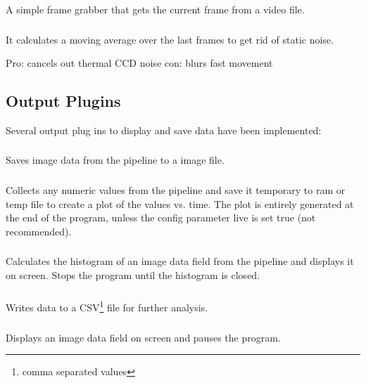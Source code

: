 A simple frame grabber that gets the current frame from a video file.

\subsubsection[inpAveragingFrameGrabber]{}

It calculates a moving average over the last  frames to get rid of static noise.

Pro: cancels out thermal CCD noise
con: blurs fast movement


\subsection{Output Plugins}

Several output plug ins to display and save data have been implemented:

\subsubsection[outSaveFrame]{}
Saves image data from the pipeline to a image file.

\subsubsection[outCreateGraph]{}
Collects any numeric values from the pipeline and save it temporary to ram or temp file to create a plot of the values vs. time.
The plot is entirely generated at the end of the program, unless the config parameter live is set true (not recommended).

\subsubsection[outHistogram]{}
Calculates the histogram of an image data field from the pipeline and displays it on screen. Stops the program until the histogram is closed.

\subsubsection[outSimpleCSVWriter]{}
Writes data to a CSV\footnote{comma separated values} file for further analysis.


\subsubsection[outSimpleDisplay]{}
Displays an image data field on screen and pauses the program.




